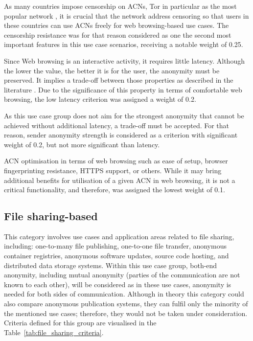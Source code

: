 As many countries impose censorship on ACNs, Tor in particular as the most popular network \cite{gfw-china, africa}, it is crucial that the network address censoring so that users in these countries can use ACNs freely for web browsing-based use cases. The censorship resistance was for that reason considered as one the second most important features in this use case scenarios, receiving a notable weight of 0.25.
    
Since Web browsing is an interactive activity, it requires little latency. Although the lower the value, the better it is for the user, the anonymity must be preserved. It implies a trade-off between those properties as described in the literature \cite{tor-design}. Due to the significance of this property in terms of comfortable web browsing, the low latency criterion was assigned a weight of 0.2.
    
As this use case group does not aim for the strongest anonymity that cannot be achieved without additional latency, a trade-off must be accepted. For that reason, sender anonymity strength is considered as a criterion with significant weight of 0.2, but not more significant than latency.
    
ACN optimisation in terms of web browsing such as ease of setup, browser fingerprinting resistance, HTTPS support, or others. While it may bring additional benefits for utilisation of a given ACN in web browsing, it is not a critical functionality, and therefore, was assigned the lowest weight of 0.1.


\subsection{File sharing-based}
This category involves use cases and application areas related to file sharing, including: one-to-many file publishing, one-to-one file transfer, anonymous container registries, anonymous software updates, source code hosting, and distributed data storage systems.
Within this use case group, both-end anonymity, including mutual anonymity (parties of the communication are not known to each other), will be considered as in these use cases, anonymity is needed for both sides of communication.
Although in theory this category could also compare anonymous publication systems, they can fulfil only the minority of the mentioned use cases; therefore, they would not be taken under consideration.
Criteria defined for this group are visualised in the Table~\ref{tab:file_sharing_criteria}.

